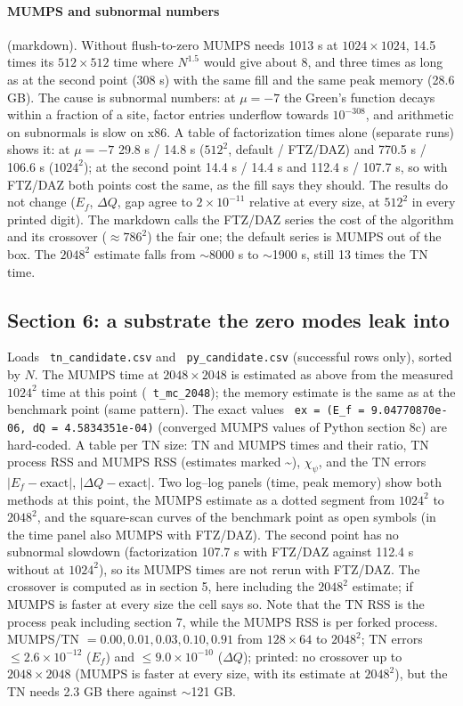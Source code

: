 \documentclass[11pt]{article}
\renewcommand{\code}[1]{\texttt{\hyphenchar\font=-1 #1}}
\begin{document}
\paragraph{MUMPS and subnormal numbers} (markdown). Without flush-to-zero MUMPS needs 1013 s at $1024\times1024$, 14.5 times its $512\times512$
time where $N^{1.5}$ would give about 8, and three times as long as at the second point (308 s) with the same fill and the same peak memory
(28.6 GB). The cause is subnormal numbers: at $\mu=-7$ the Green's function decays within a fraction of a site, factor entries underflow
towards $10^{-308}$, and arithmetic on subnormals is slow on x86. A table of factorization times alone (separate runs) shows it: at
$\mu=-7$ 29.8 s / 14.8 s ($512^2$, default / FTZ/DAZ) and 770.5 s / 106.6 s ($1024^2$); at the second point 14.4 s / 14.4 s and 112.4 s / 107.7 s,
so with FTZ/DAZ both points cost the same, as the fill says they should. The results do not change ($E_f$, $\Delta Q$, gap agree to
$2\times10^{-11}$ relative at every size, at $512^2$ in every printed digit). The markdown calls the FTZ/DAZ series the cost of the algorithm and
its crossover ($\approx786^2$) the fair one; the default series is MUMPS out of the box. The $2048^2$ estimate falls from $\sim$8000 s to
$\sim$1900 s, still 13 times the TN time.

\subsection{Section 6: a substrate the zero modes leak into}

Loads \code{tn\_candidate.csv} and \code{py\_candidate.csv} (successful rows only), sorted by $N$. The MUMPS time at $2048\times2048$ is estimated
as above from the measured $1024^2$ time at this point (\code{t\_mc\_2048}); the memory estimate is the same as at the benchmark point (same
pattern). The exact values \code{ex = (E\_f = 9.04770870e-06, dQ = 4.5834351e-04)} (converged MUMPS values of Python section 8c) are hard-coded.
A table per TN size: TN and MUMPS times and their ratio, TN process RSS and MUMPS RSS (estimates marked \textasciitilde), $\chi_\psi$, and the TN
errors $|E_f-\text{exact}|$, $|\Delta Q-\text{exact}|$. Two log--log panels (time, peak memory) show both methods at this point, the MUMPS estimate
as a dotted segment from $1024^2$ to $2048^2$, and the square-scan curves of the benchmark point as open symbols (in the time panel
also MUMPS with FTZ/DAZ). The second point has no subnormal slowdown (factorization 107.7 s with FTZ/DAZ against 112.4 s without at $1024^2$),
so its MUMPS times are not rerun with FTZ/DAZ. The crossover is computed as in
section 5, here including the $2048^2$ estimate; if MUMPS is faster at every size the cell says so. Note that the TN RSS is the process peak
including section 7, while the MUMPS RSS is per forked process.
MUMPS/TN $= 0.00, 0.01, 0.03, 0.10, 0.91$ from $128\times64$ to $2048^2$; TN errors $\le2.6\times10^{-12}$ ($E_f$) and $\le9.0\times10^{-10}$ ($\Delta Q$); printed: no crossover up to $2048\times2048$ (MUMPS is faster at every size, with its estimate at $2048^2$), but the TN needs 2.3 GB there against $\sim$121 GB.
\end{document}
